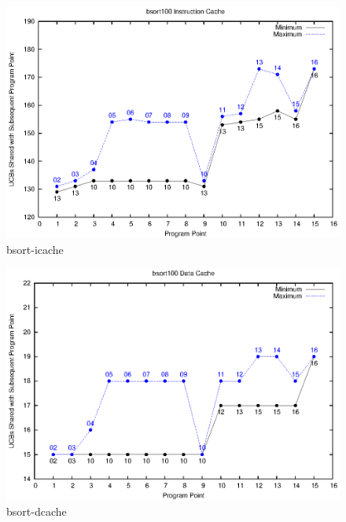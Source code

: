 \begin{figure}[h]
\begin{center}
    \includegraphics[scale = .65, clip]{eps/bsort-icache.eps}
\caption{bsort-icache}\label{fig:bsort-icache}
\end{center}
\end{figure}

\begin{figure}[h]
\begin{center}
    \includegraphics[scale = .65, clip]{eps/bsort-dcache.eps}
\caption{bsort-dcache}\label{fig:bsort-dcache}
\end{center}
\end{figure}

